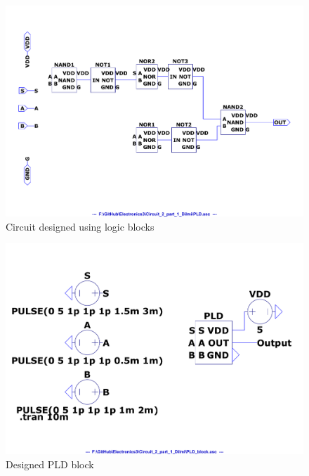 \documentclass[a4paper,11pt]{article}%
\begin{document}
\begin{figure}[H]
	\centering
	\includegraphics[scale=0.55]{figures/2part1/cct.pdf}
	\caption{Circuit designed using logic blocks}
\end{figure}

\begin{figure}[H]
	\centering
	\includegraphics[scale=0.5]{figures/2part1/block.pdf}
	\caption{Designed PLD block}
\end{figure}
\end{document}
